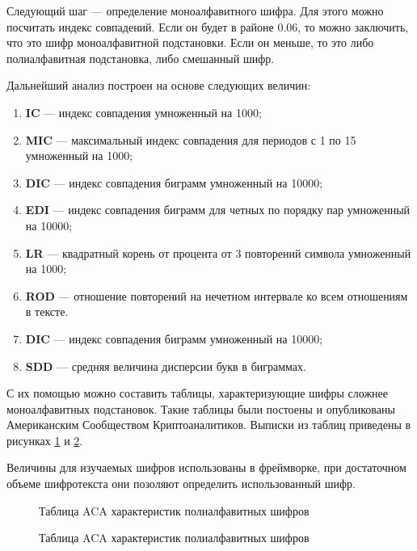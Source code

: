 Следующий шаг --- определение моноалфавитного шифра. 
Для этого можно посчитать индекс совпадений. Если он будет в районе
0.06, то можно заключить, что это шифр моноалфавитной подстановки.
Если он меньше, то это либо полиалфавитная подстановка, либо 
смешанный шифр.

Дальнейший анализ построен на основе следующих величин:

\begin{enumerate}
\item \textbf{IC} --- индекс совпадения умноженный на 1000;
\item \textbf{MIC} --- максимальный индекс совпадения для периодов
    с 1 по 15 умноженный на 1000;
\item \textbf{DIC} --- индекс совпадения биграмм
    умноженный на 10000;
\item \textbf{EDI} --- индекс совпадения биграмм для четных по порядку пар
    умноженный на 10000;
\item \textbf{LR} --- квадратный корень от процента от 3 повторений 
    символа умноженный на 1000;
\item \textbf{ROD} --- отношение повторений на нечетном интервале ко
    всем отношениям в тексте.
\item \textbf{DIC} --- индекс совпадения биграмм
    умноженный на 10000;
\item \textbf{SDD} --- средняя величина дисперсии букв в биграммах.
\end{enumerate}

С их помощью можно составить таблицы, характеризующие шифры 
сложнее моноалфавитных подстановок. Такие таблицы были постоены
и опубликованы Американским Сообществом Криптоаналитиков.
Выписки из таблиц приведены в рисунках 
\ref{aca-table1} и \ref{aca-table2}.

Величины для изучаемых шифров использованы в фреймворке,
при достаточном объеме шифротекста они позоляют определить
использованный шифр.

\begin{figure}[h]
\noindent{}
\caption{Таблица ACA характеристик полиалфавитных шифров}
\label{aca-table1}
\end{figure}

\begin{figure}[h]
\noindent{}
\caption{Таблица ACA характеристик полиалфавитных шифров}
\label{aca-table2}
\end{figure}
